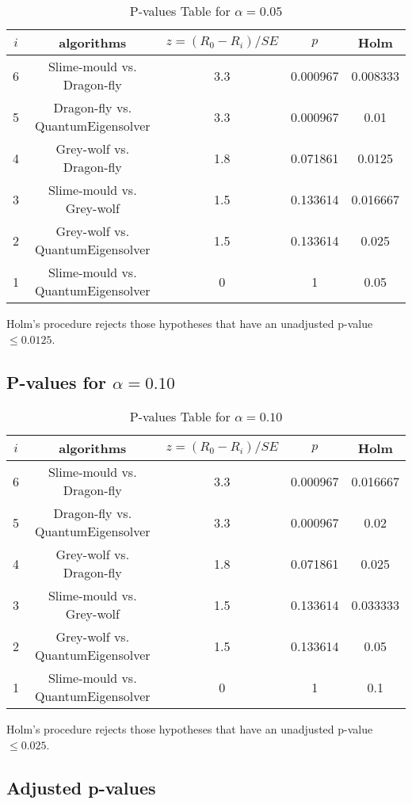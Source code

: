 \documentclass[a4paper,10pt]{article}
\begin{document}
\begin{landscape}
\begin{table}[!htp]
\centering\scriptsize
\begin{tabular}{ccccc}
$i$&algorithms&$z=(R_0 - R_i)/SE$&$p$&Holm\\
\hline6&Slime-mould vs. Dragon-fly&3.3&0.000967&0.008333\\
5&Dragon-fly vs. QuantumEigensolver&3.3&0.000967&0.01\\
4&Grey-wolf vs. Dragon-fly&1.8&0.071861&0.0125\\
3&Slime-mould vs. Grey-wolf&1.5&0.133614&0.016667\\
2&Grey-wolf vs. QuantumEigensolver&1.5&0.133614&0.025\\
1&Slime-mould vs. QuantumEigensolver&0&1&0.05\\
\hline
\end{tabular}
\caption{P-values Table for $\alpha=0.05$}
\end{table}Holm's procedure rejects those hypotheses that have an unadjusted p-value $\le0.0125$.

\pagebreak

\subsection{P-values for $\alpha=0.10$}

\begin{table}[!htp]
\centering\scriptsize
\begin{tabular}{ccccc}
$i$&algorithms&$z=(R_0 - R_i)/SE$&$p$&Holm\\
\hline6&Slime-mould vs. Dragon-fly&3.3&0.000967&0.016667\\
5&Dragon-fly vs. QuantumEigensolver&3.3&0.000967&0.02\\
4&Grey-wolf vs. Dragon-fly&1.8&0.071861&0.025\\
3&Slime-mould vs. Grey-wolf&1.5&0.133614&0.033333\\
2&Grey-wolf vs. QuantumEigensolver&1.5&0.133614&0.05\\
1&Slime-mould vs. QuantumEigensolver&0&1&0.1\\
\hline
\end{tabular}
\caption{P-values Table for $\alpha=0.10$}
\end{table}Holm's procedure rejects those hypotheses that have an unadjusted p-value $\le0.025$.

\pagebreak

\subsection{Adjusted p-values}


\end{landscape}
\end{document}
